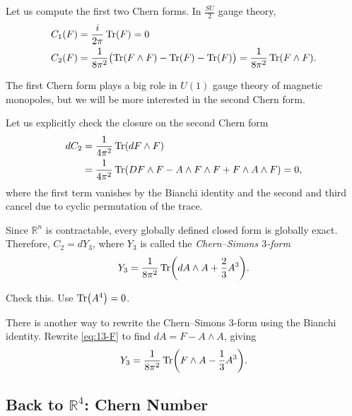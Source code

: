 Let us compute the first two Chern forms.
In $\frac{SU}{2}$ gauge theory,
\begin{align}
  C_1(F) &= \frac{i}{2 \pi} \Tr(F) = 0 \\
  C_2(F) &= \frac{1}{8 \pi^2} \bigl( \Tr(F \wedge F) - \Tr(F) - \Tr(F) \bigr) = \frac{1}{8 \pi^2} \Tr(F \wedge F).
\end{align}

The first Chern form plays a big role in $U(1)$ gauge theory of magnetic monopoles, but we will be more interested in the second Chern form.

Let us explicitly check the closure on the second Chern form
\begin{align}
  d C_2 &= \frac{1}{4 \pi^2} \Tr(d F \wedge F) \\
	&= \frac{1}{4 \pi^2} \Tr(D F \wedge F - A \wedge F \wedge F + F \wedge A \wedge F) = 0,
\end{align}
where the first term vanishes by the Bianchi identity and the second and third cancel due to cyclic permutation of the trace.

Since $\mathbb{R}^n$ is contractable, every globally defined closed form is globally exact.
Therefore, $C_2 = d Y_3$, where $Y_3$ is called the \emph{Chern--Simons $3$-form}
\begin{equation}
  Y_3 = \frac{1}{8\pi ^2} \Tr(d A \wedge A + \frac{2}{3} A^3).
\end{equation}
\begin{exercise}
  Check this. Use $\Tr(A^4) = 0$.
\end{exercise}

There is another way to rewrite the Chern--Simons $3$-form using the Bianchi identity.
Rewrite \eqref{eq:13-F} to find $d A = F - A \wedge A$, giving
\begin{equation}
  Y_3 = \frac{1}{8 \pi^2} \Tr(F \wedge A - \frac{1}{3} A^3).
\end{equation}

\subsection{Back to \texorpdfstring{$\mathbb{R}^4$}{Four Dimensions}: Chern Number}%
\label{sub:back_to}

